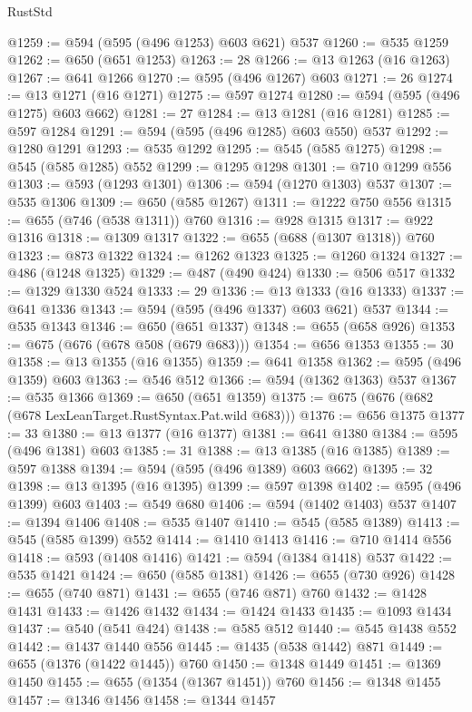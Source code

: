 \begin{lexlean}{RustStd}
\begin{coremodule}
@1259 := @594 (@595 (@496 @1253) @603 @621) @537
@1260 := @535 @1259
@1262 := @650 (@651 @1253)
@1263 := 28
@1266 := @13 @1263 (@16 @1263)
@1267 := @641 @1266
@1270 := @595 (@496 @1267) @603
@1271 := 26
@1274 := @13 @1271 (@16 @1271)
@1275 := @597 @1274
@1280 := @594 (@595 (@496 @1275) @603 @662)
@1281 := 27
@1284 := @13 @1281 (@16 @1281)
@1285 := @597 @1284
@1291 := @594 (@595 (@496 @1285) @603 @550) @537
@1292 := @1280 @1291
@1293 := @535 @1292
@1295 := @545 (@585 @1275)
@1298 := @545 (@585 @1285) @552
@1299 := @1295 @1298
@1301 := @710 @1299 @556
@1303 := @593 (@1293 @1301)
@1306 := @594 (@1270 @1303) @537
@1307 := @535 @1306
@1309 := @650 (@585 @1267)
@1311 := @1222 @750 @556
@1315 := @655 (@746 (@538 @1311)) @760
@1316 := @928 @1315
@1317 := @922 @1316
@1318 := @1309 @1317
@1322 := @655 (@688 (@1307 @1318)) @760
@1323 := @873 @1322
@1324 := @1262 @1323
@1325 := @1260 @1324
@1327 := @486 (@1248 @1325)
@1329 := @487 (@490 @424)
@1330 := @506 @517
@1332 := @1329 @1330 @524
@1333 := 29
@1336 := @13 @1333 (@16 @1333)
@1337 := @641 @1336
@1343 := @594 (@595 (@496 @1337) @603 @621) @537
@1344 := @535 @1343
@1346 := @650 (@651 @1337)
@1348 := @655 (@658 @926)
@1353 := @675 (@676 (@678 @508 (@679 @683)))
@1354 := @656 @1353
@1355 := 30
@1358 := @13 @1355 (@16 @1355)
@1359 := @641 @1358
@1362 := @595 (@496 @1359) @603
@1363 := @546 @512
@1366 := @594 (@1362 @1363) @537
@1367 := @535 @1366
@1369 := @650 (@651 @1359)
@1375 := @675 (@676 (@682 (@678 LexLeanTarget.RustSyntax.Pat.wild @683)))
@1376 := @656 @1375
@1377 := 33
@1380 := @13 @1377 (@16 @1377)
@1381 := @641 @1380
@1384 := @595 (@496 @1381) @603
@1385 := 31
@1388 := @13 @1385 (@16 @1385)
@1389 := @597 @1388
@1394 := @594 (@595 (@496 @1389) @603 @662)
@1395 := 32
@1398 := @13 @1395 (@16 @1395)
@1399 := @597 @1398
@1402 := @595 (@496 @1399) @603
@1403 := @549 @680
@1406 := @594 (@1402 @1403) @537
@1407 := @1394 @1406
@1408 := @535 @1407
@1410 := @545 (@585 @1389)
@1413 := @545 (@585 @1399) @552
@1414 := @1410 @1413
@1416 := @710 @1414 @556
@1418 := @593 (@1408 @1416)
@1421 := @594 (@1384 @1418) @537
@1422 := @535 @1421
@1424 := @650 (@585 @1381)
@1426 := @655 (@730 @926)
@1428 := @655 (@740 @871)
@1431 := @655 (@746 @871) @760
@1432 := @1428 @1431
@1433 := @1426 @1432
@1434 := @1424 @1433
@1435 := @1093 @1434
@1437 := @540 (@541 @424)
@1438 := @585 @512
@1440 := @545 @1438 @552
@1442 := @1437 @1440 @556
@1445 := @1435 (@538 @1442) @871
@1449 := @655 (@1376 (@1422 @1445)) @760
@1450 := @1348 @1449
@1451 := @1369 @1450
@1455 := @655 (@1354 (@1367 @1451)) @760
@1456 := @1348 @1455
@1457 := @1346 @1456
@1458 := @1344 @1457

\end{coremodule}
\end{lexlean}
